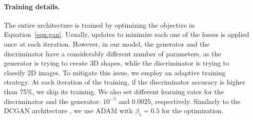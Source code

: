 \paragraph*{Training details.}
The entire architecture is trained by optimizing the objective in Equation~\ref{eqn:gan}.
Usually, updates to minimize each one of the losses is applied once at each
iteration.
However, in our model, the generator and the discriminator have a considerably different
number of parameters, as the generator is trying to create 3D shapes,
while the discriminator is trying to classify 2D images.
To mitigate this issue, we employ an adaptive training strategy.
At each iteration of the training, if the discriminator accuracy is higher than 75\%,
we skip its training.
We also set different learning rates for the discriminator and the generator:
$10^{-5}$ and $0.0025$, respectively.
Similarly to the DCGAN architecture \cite{radford2015unsupervised}, we
use ADAM with $\beta_1=0.5$ for the optimization.
